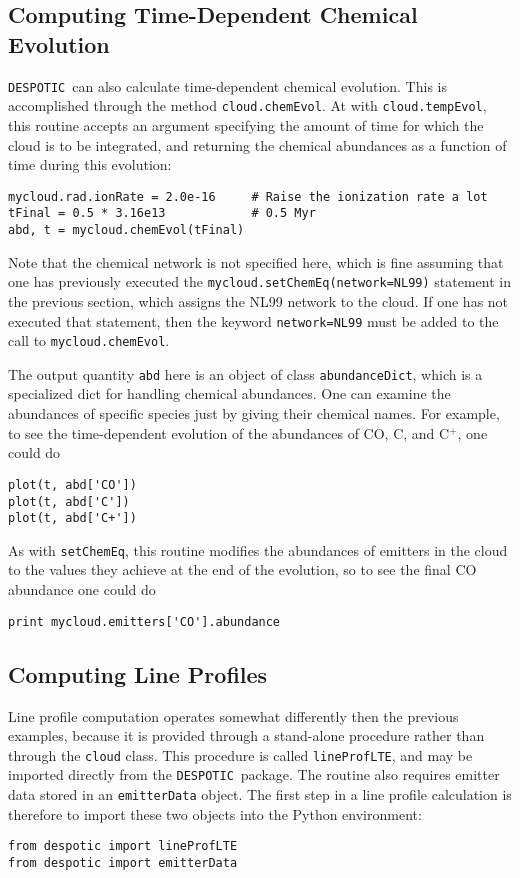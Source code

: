\documentclass[12pt]{article}
\newcommand{\despotic}{\texttt{DESPOTIC}}
\begin{document}
\subsection{Computing Time-Dependent Chemical Evolution}

\despotic\ can also calculate time-dependent chemical evolution. This is accomplished through the method \verb=cloud.chemEvol=.  At with \verb=cloud.tempEvol=, this routine accepts an argument specifying the amount of time for which the cloud is to be integrated, and returning the chemical abundances as a function of time during this evolution:
\begin{verbatim}
mycloud.rad.ionRate = 2.0e-16     # Raise the ionization rate a lot
tFinal = 0.5 * 3.16e13            # 0.5 Myr
abd, t = mycloud.chemEvol(tFinal)
\end{verbatim}
Note that the chemical network is not specified here, which is fine assuming that one has previously executed the \verb+mycloud.setChemEq(network=NL99)+ statement in the previous section, which assigns the NL99 network to the cloud. If one has not executed that statement, then the keyword \verb+network=NL99+ must be added to the call to \verb=mycloud.chemEvol=.

The output quantity \verb=abd= here is an object of class \verb=abundanceDict=, which is a specialized dict for handling chemical abundances. One can examine the abundances of specific species just by giving their chemical names. For example, to see the time-dependent evolution of the abundances of CO, C, and C$^+$, one could do
\begin{verbatim}
plot(t, abd['CO'])
plot(t, abd['C'])
plot(t, abd['C+'])
\end{verbatim}
As with \verb=setChemEq=, this routine modifies the abundances of emitters in the cloud to the values they achieve at the end of the evolution, so to see the final CO abundance one could do
\begin{verbatim}
print mycloud.emitters['CO'].abundance
\end{verbatim}


\subsection{Computing Line Profiles}

Line profile computation operates somewhat differently then the previous examples, because it is provided through a stand-alone procedure rather than through the \verb=cloud= class. This procedure is called \verb=lineProfLTE=, and may be imported directly from the \despotic\ package. The routine also requires emitter data stored in an \verb=emitterData= object. The first step in a line profile calculation is therefore to import these two objects into the Python environment:
\begin{verbatim}
from despotic import lineProfLTE
from despotic import emitterData
\end{verbatim}
\end{document}
